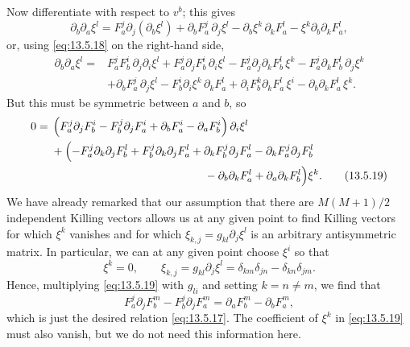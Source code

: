 Now differentiate with respect to \(v^b\); this gives
\[
  \partial_b\partial_a\xi^l
  =
  F_a^j\partial_j(\partial_b\xi^l)
  +\partial_bF_a^j\,\partial_j\xi^l
  -\partial_b\xi^k\,\partial_kF_a^l
  -\xi^k\partial_b\partial_kF_a^l,
\]
or, using \eqref{eq:13.5.18} on the right-hand side,
\[
  \begin{aligned}
  \partial_b\partial_a\xi^l
  ={}&
  F_a^jF_b^i\,\partial_j\partial_i\xi^l
  +F_a^j\partial_jF_b^i\,\partial_i\xi^l
  -F_a^j\partial_j\partial_kF_b^l\,\xi^k
  -F_a^j\partial_kF_b^l\,\partial_j\xi^k
  \\
  &+\partial_bF_a^j\,\partial_j\xi^l
  -F_b^i\partial_i\xi^k\,\partial_kF_a^l
  +\partial_iF_b^k\partial_kF_a^l\,\xi^i
  -\partial_b\partial_kF_a^l\,\xi^k.
  \end{aligned}
\]
But this must be symmetric between \(a\) and \(b\), so
\begin{align}
  0={}&
  \left(
    F_a^j\partial_jF_b^i
    -F_b^j\partial_jF_a^i
    +\partial_bF_a^i
    -\partial_aF_b^i
  \right)\partial_i\xi^l
  \notag\\
  &+
  \Bigl(
    -F_a^j\partial_k\partial_jF_b^l
    +F_b^j\partial_k\partial_jF_a^l
    +\partial_kF_b^j\partial_jF_a^l
    -\partial_kF_a^j\partial_jF_b^l
    \notag\\
  &\hspace{48mm}
    -\partial_b\partial_kF_a^l
    +\partial_a\partial_kF_b^l
  \Bigr)\xi^k.
  \tag{13.5.19}\label{eq:13.5.19}
\end{align}
We have already remarked that our assumption that there are \(M(M+1)/2\)
independent Killing vectors allows us at any given point to find Killing
vectors for which \(\xi^k\) vanishes and for which
\(\xi_{k,j}=g_{kl}\partial_j\xi^l\) is an arbitrary antisymmetric matrix.
In particular, we can at any given point choose \(\xi^i\) so that
\[
  \xi^k=0,
  \qquad
  \xi_{k,j}
  =
  g_{kl}\partial_j\xi^l
  =
  \delta_{km}\delta_{jn}-\delta_{kn}\delta_{jm}.
\]
Hence, multiplying \eqref{eq:13.5.19} with \(g_{li}\) and setting
\(k=n\neq m\), we find that
\[
  F_a^j\partial_jF_b^m-F_b^j\partial_jF_a^m
  =
  \partial_aF_b^m-\partial_bF_a^m,
\]
which is just the desired relation \eqref{eq:13.5.17}. The coefficient of
\(\xi^k\) in \eqref{eq:13.5.19} must also vanish, but we do not need this
information here.


